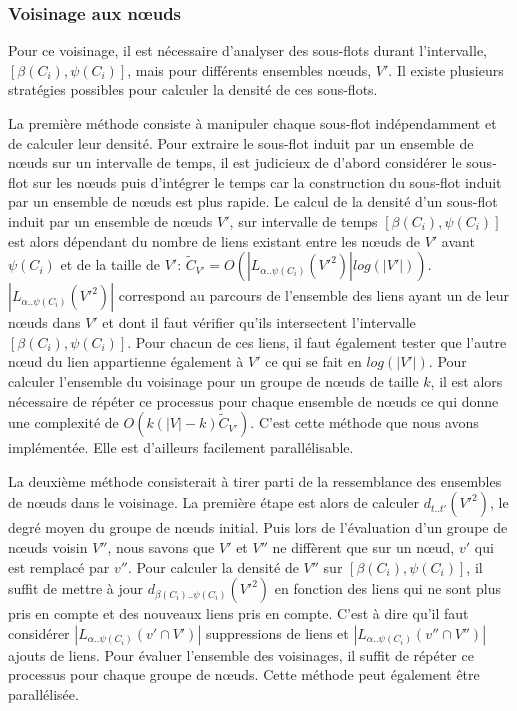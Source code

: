 \subsubsection{Voisinage aux n\oe{}uds}
Pour ce voisinage, il est nécessaire d'analyser des sous-flots durant l'intervalle, $[\beta(C_i),\psi(C_i)]$, mais pour différents ensembles n\oe{}uds, $V'$.
Il existe plusieurs stratégies possibles pour calculer la densité de ces sous-flots. 

La première méthode consiste à manipuler chaque sous-flot indépendamment et de calculer leur densité.
Pour extraire le sous-flot induit par un ensemble de n\oe{}uds sur un intervalle de temps,
il est judicieux de d'abord considérer le sous-flot sur les n\oe{}uds puis d'intégrer le temps car la construction du sous-flot induit par un ensemble de n\oe{}uds est plus rapide.
Le calcul de la densité d'un sous-flot induit par un ensemble de n\oe{}uds $V'$, sur intervalle de temps $[\beta(C_i),\psi(C_i)]$ est alors dépendant du nombre de liens existant entre les n\oe{}uds de $V'$ avant $\psi(C_i)$ et de la taille de $V'$: $\tilde{C}_{V'}=O(|L_{\alpha..\psi(C_i)}(V'^2)|log(|V'|))$.
$|L_{\alpha..\psi(C_i)}(V'^2)|$ correspond au parcours de l'ensemble des liens ayant un de leur n\oe{}uds dans $V'$ et dont il faut vérifier qu'ils intersectent l'intervalle $[\beta(C_i),\psi(C_i)]$.
Pour chacun de ces liens, il faut également tester que l'autre n\oe{}ud du lien appartienne également à $V'$ ce qui se fait en $log(|V'|)$.
Pour calculer l'ensemble du voisinage pour un groupe de n\oe{}uds de taille $k$, il est alors nécessaire de répéter ce processus pour chaque ensemble de n\oe{}uds ce qui donne une complexité de $O(k(|V|-k) \tilde{C}_{V'})$.
C'est cette méthode que nous avons implémentée.
Elle est d'ailleurs facilement parallélisable.

La deuxième méthode consisterait à tirer parti de la ressemblance des ensembles de n\oe{}uds dans le voisinage.
La première étape est alors de calculer $d_{t..t'}(V'^2)$, le degré moyen du groupe de n\oe{}uds initial.
Puis lors de l'évaluation d'un groupe de n\oe{}uds voisin $V''$, nous savons que $V'$ et $V''$ ne diffèrent que sur un n\oe{}ud, $v'$ qui est remplacé par $v''$.
Pour calculer la densité de $V''$ sur $[\beta(C_i),\psi(C_i)]$, il suffit de mettre à jour $d_{\beta(C_i)..\psi(C_i)}(V'^2)$ en fonction des liens qui ne sont plus pris en compte et des nouveaux liens pris en compte.
C'est à dire qu'il faut considérer $|L_{\alpha..\psi(C_i)}({v'} \cap V')|$ suppressions de liens et $|L_{\alpha..\psi(C_i)}({v''} \cap V'')|$ ajouts de liens.
Pour évaluer l'ensemble des voisinages, il suffit de répéter ce processus pour chaque groupe de n\oe{}uds.
Cette méthode peut également être parallélisée.


